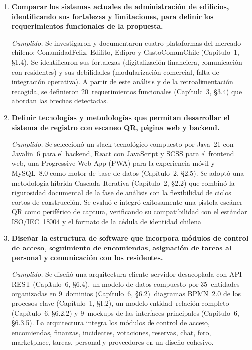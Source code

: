 \begin{enumerate}
    \item \textbf{Comparar los sistemas actuales de administración de edificios, identificando sus fortalezas y limitaciones, para definir los requerimientos funcionales de la propuesta.}

    \textit{Cumplido.} Se investigaron y documentaron cuatro plataformas del mercado chileno: ComunidadFeliz, Edifito, Edipro y GastoComunChile (Capítulo~1, §1.4). Se identificaron sus fortalezas (digitalización financiera, comunicación con residentes) y sus debilidades (modularización comercial, falta de integración operativa). A partir de este análisis y de la retroalimentación recogida, se definieron 20~requerimientos funcionales (Capítulo~3, §3.4) que abordan las brechas detectadas.

    \item \textbf{Definir tecnologías y metodologías que permitan desarrollar el sistema de registro con escaneo QR, página web y backend.}

    \textit{Cumplido.} Se seleccionó un stack tecnológico compuesto por Java~21 con Javalin~6 para el backend, React con JavaScript y SCSS para el frontend web, una Progressive Web App (PWA) para la experiencia móvil y MySQL~8.0 como motor de base de datos (Capítulo~2, §2.5). Se adoptó una metodología híbrida Cascada--Iterativa (Capítulo~2, §2.2) que combinó la rigurosidad documental de la fase de análisis con la flexibilidad de ciclos cortos de construcción. Se evaluó e integró exitosamente una pistola escáner QR como periférico de captura, verificando su compatibilidad con el estándar ISO/IEC~18004 y el formato de la cédula de identidad chilena.

    \item \textbf{Diseñar la estructura de software que incorpora módulos de control de acceso, seguimiento de encomiendas, asignación de tareas al personal y comunicación con los residentes.}

    \textit{Cumplido.} Se diseñó una arquitectura cliente--servidor desacoplada con API REST (Capítulo~6, §6.4), un modelo de datos compuesto por 35~entidades organizadas en 9~dominios (Capítulo~6, §6.2), diagramas BPMN~2.0 de los procesos clave (Capítulo~1, §1.2), un modelo entidad--relación completo (Capítulo~6, §6.2.2) y 9~mockups de las interfaces principales (Capítulo~6, §6.3.5). La arquitectura integra los módulos de control de acceso, encomiendas, finanzas, incidentes, votaciones, reservas, chat, foro, marketplace, tareas, personal y proveedores en un diseño cohesivo.


\end{enumerate}
